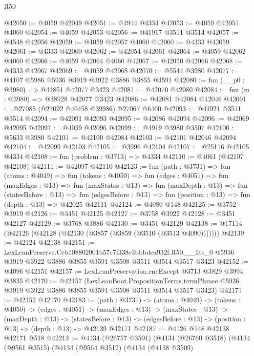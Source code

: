 \begin{lexlean}{R50}
\begin{coremodule}
@42050 := @4059 @42049
@42051 := @4914 @4334
@42053 := @4059 @42051 @4060
@42054 := @4059 @42053
@42056 := @41917 @3511 @3514
@42057 := @4548 @42056
@42059 := @4059 @42057 @4060
@42060 := @4333 @42059
@42061 := @4333 @42060
@42062 := @42054 @42061
@42064 := @4059 @42062 @4060
@42066 := @4059 @42064 @4060
@42067 := @42050 @42066
@42068 := @4333 @42067
@42069 := @4059 @42068
@42070 := @5544 @3980
@42077 := @4107 @5986 @5936 @3919 @3922 @3886 @3855 @3591
@42080 := fun (__p0 : @3980) => @41851 @42077 @3423
@42081 := @42070 @42080
@42084 := fun (m : @3980) => @38928 @42077 @3423
@42086 := @42081 @42084 @42046
@42091 := @27085 (@27092 @40458 @39986) @27067 @6400
@42093 := @41921 @3511 @3514
@42094 := @42091 @42093
@42095 := @42086 @42094
@42096 := @42069 @42095
@42097 := @4059 @42096
@42099 := @4919 @3980 @3507
@42100 := @5633 @3980
@42101 := @42100 @42084
@42103 := @42101 @42046 @42094
@42104 := @42099 @42103
@42105 := @3996 @42104
@42107 := @25116 @42105 @4334
@42108 := fun (problem : @3713) => @4334
@42110 := @4061 (@42107 @42108)
@42111 := @42097 @42110
@42123 := fun (path : @3731) =>
  fun (atoms : @4049) =>
  fun (tokens : @4050) =>
  fun (edges : @4051) =>
  fun (maxEdges : @13) =>
  fun (maxStates : @13) =>
  fun (maxDepth : @13) =>
  fun (statesBefore : @13) =>
  fun (edgesBefore : @13) => fun (position : @13) => fun (depth : @13) => @42025 @42111
@42124 := @4080 @148
@42125 := @3752 @3919
@42126 := @3451 @42125
@42127 := @3758 @3922
@42128 := @3451 @42127
@42129 := @3768 @3886
@42130 := @3451 @42129
@42138 := @17114 (@42126 (@42128 (@42130 (@3857 (@3859 (@3510 (@3513 @4090)))))))
@42139 := @42124 @42138
@42151 := LexLeanPreserve.Ceb108802001b57e7f338e3bbbdea932f.R50.__fits_0
    @5936
    @3919
    @3922
    @3886
    @3855
    @3591
    @3508
    @3511
    @3514
    @3517
    @3423
@42152 := @4096 @42151
@42157 := LexLeanPreservation.encExcept @3713 @3829 @3994 @3835
@42170 := @42157
    (LexLeanBoot.PropositionTerms.termPhrase
      @5936
      @3919
      @3922
      @3886
      @3855
      @3591
      @3508
      @3511
      @3514
      @3517
      @3423)
@42171 := @42152 @42170
@42183 := (path : @3731) ->
  (atoms : @4049) ->
  (tokens : @4050) ->
  (edges : @4051) ->
  (maxEdges : @13) ->
  (maxStates : @13) ->
  (maxDepth : @13) ->
  (statesBefore : @13) -> (edgesBefore : @13) -> (position : @13) -> (depth : @13) -> @42139 @42171
@42187 := @4126 @148 @42138 @42171 @518
@42213 := @4134
    (@26757 @3501)
    (@4134
      (@26760 @3518)
      (@4134
        (@9561 @3515)
        (@4134
          (@9564 @3512)
          (@4134
            (@4138 @3509)

\end{coremodule}
\end{lexlean}
